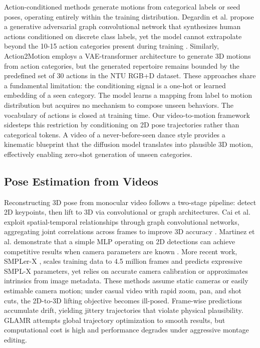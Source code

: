 Action-conditioned methods generate motions from categorical labels or seed poses, operating entirely within the training distribution. Degardin et al. propose a generative adversarial graph convolutional network that synthesizes human actions conditioned on discrete class labels, yet the model cannot extrapolate beyond the 10-15 action categories present during training \cite{gagcn2021}. Similarly, Action2Motion \cite{act2mo2020} employs a VAE-transformer architecture to generate 3D motions from action categories, but the generated repertoire remains bounded by the predefined set of 30 actions in the NTU RGB+D dataset. These approaches share a fundamental limitation: the conditioning signal is a one-hot or learned embedding of a seen category. The model learns a mapping from label to motion distribution but acquires no mechanism to compose unseen behaviors. The vocabulary of actions is closed at training time. Our video-to-motion framework sidesteps this restriction by conditioning on 2D pose trajectories rather than categorical tokens. A video of a never-before-seen dance style provides a kinematic blueprint that the diffusion model translates into plausible 3D motion, effectively enabling zero-shot generation of unseen categories.

\subsection{Pose Estimation from Videos}

Reconstructing 3D pose from monocular video follows a two-stage pipeline: detect 2D keypoints, then lift to 3D via convolutional or graph architectures. Cai et al. exploit spatial-temporal relationships through graph convolutional networks, aggregating joint correlations across frames to improve 3D accuracy \cite{gcnpose2019}. Martinez et al. demonstrate that a simple MLP operating on 2D detections can achieve competitive results when camera parameters are known \cite{poseest2017}. More recent work, SMPLer-X \cite{smpl2024}, scales training data to 4.5 million frames and predicts expressive SMPL-X parameters, yet relies on accurate camera calibration or approximates intrinsics from image metadata. These methods assume static cameras or easily estimable camera motion; under casual video with rapid zoom, pan, and shot cuts, the 2D-to-3D lifting objective becomes ill-posed. Frame-wise predictions accumulate drift, yielding jittery trajectories that violate physical plausibility. GLAMR \cite{glamr2022} attempts global trajectory optimization to smooth results, but computational cost is high and performance degrades under aggressive montage editing.

